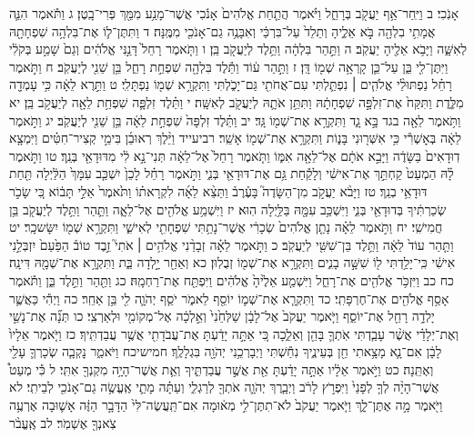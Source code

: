 \documentclass[twoside, openany, parskip=half, 11pt]{book}
\begin{document}
אָנֹֽכִי׃ ב וַיִּֽחַר־אַ֥ף יַעֲקֹ֖ב בְּרָחֵ֑ל וַיֹּ֗אמֶר הֲתַ֤חַת אֱלֹהִים֙ אָנֹ֔כִי אֲשֶׁר־מָנַ֥ע מִמֵּ֖ךְ פְּרִי־בָֽטֶן׃ ג וַתֹּ֕אמֶר הִנֵּ֛ה אֲמָתִ֥י בִלְהָ֖ה בֹּ֣א אֵלֶ֑יהָ וְתֵלֵד֙ עַל־בִּרְכַּ֔י וְאִבָּנֶ֥ה גַם־אָנֹכִ֖י מִמֶּֽנָּה׃ ד וַתִּתֶּן־ל֛וֹ אֶת־בִּלְהָ֥ה שִׁפְחָתָ֖הּ לְאִשָּׁ֑ה וַיָּבֹ֥א אֵלֶ֖יהָ יַעֲקֹֽב׃ ה וַתַּ֣הַר בִּלְהָ֔ה וַתֵּ֥לֶד לְיַעֲקֹ֖ב בֵּֽן׃ ו וַתֹּ֤אמֶר רָחֵל֙ דָּנַ֣נִּי אֱלֹהִ֔ים וְגַם֙ שָׁמַ֣ע בְּקֹלִ֔י וַיִּתֶּן־לִ֖י בֵּ֑ן עַל־כֵּ֛ן קָרְאָ֥ה שְׁמ֖וֹ דָּֽן׃ ז וַתַּ֣הַר ע֔וֹד וַתֵּ֕לֶד בִּלְהָ֖ה שִׁפְחַ֣ת רָחֵ֑ל בֵּ֥ן שֵׁנִ֖י לְיַעֲקֹֽב׃ ח וַתֹּ֣אמֶר רָחֵ֗ל נַפְתּוּלֵ֨י אֱלֹהִ֧ים ׀ נִפְתַּ֛לְתִּי עִם־אֲחֹתִ֖י גַּם־יָכֹ֑לְתִּי וַתִּקְרָ֥א שְׁמ֖וֹ נַפְתָּלִֽי׃ ט וַתֵּ֣רֶא לֵאָ֔ה כִּ֥י עָמְדָ֖ה מִלֶּ֑דֶת וַתִּקַּח֙ אֶת־זִלְפָּ֣ה שִׁפְחָתָ֔הּ וַתִּתֵּ֥ן אֹתָ֛הּ לְיַעֲקֹ֖ב לְאִשָּֽׁה׃ י וַתֵּ֗לֶד זִלְפָּ֛ה שִׁפְחַ֥ת לֵאָ֖ה לְיַעֲקֹ֥ב בֵּֽן׃ יא וַתֹּ֥אמֶר לֵאָ֖ה בגד בָּ֣א גָ֑ד וַתִּקְרָ֥א אֶת־שְׁמ֖וֹ גָּֽד׃ יב וַתֵּ֗לֶד זִלְפָּה֙ שִׁפְחַ֣ת לֵאָ֔ה בֵּ֥ן שֵׁנִ֖י לְיַעֲקֹֽב׃ יג וַתֹּ֣אמֶר לֵאָ֔ה בְּאׇשְׁרִ֕י כִּ֥י אִשְּׁר֖וּנִי בָּנ֑וֹת וַתִּקְרָ֥א אֶת־שְׁמ֖וֹ אָשֵֽׁר׃ רביעייד וַיֵּ֨לֶךְ רְאוּבֵ֜ן בִּימֵ֣י קְצִיר־חִטִּ֗ים וַיִּמְצָ֤א דֽוּדָאִים֙ בַּשָּׂדֶ֔ה וַיָּבֵ֣א אֹתָ֔ם אֶל־לֵאָ֖ה אִמּ֑וֹ וַתֹּ֤אמֶר רָחֵל֙ אֶל־לֵאָ֔ה תְּנִי־נָ֣א לִ֔י מִדּוּדָאֵ֖י בְּנֵֽךְ׃ טו וַתֹּ֣אמֶר לָ֗הּ הַמְעַט֙ קַחְתֵּ֣ךְ אֶת־אִישִׁ֔י וְלָקַ֕חַת גַּ֥ם אֶת־דּוּדָאֵ֖י בְּנִ֑י וַתֹּ֣אמֶר רָחֵ֗ל לָכֵן֙ יִשְׁכַּ֤ב עִמָּךְ֙ הַלַּ֔יְלָה תַּ֖חַת דּוּדָאֵ֥י בְנֵֽךְ׃ טז וַיָּבֹ֨א יַעֲקֹ֣ב מִן־הַשָּׂדֶה֮ בָּעֶ֒רֶב֒ וַתֵּצֵ֨א לֵאָ֜ה לִקְרָאת֗וֹ וַתֹּ֙אמֶר֙ אֵלַ֣י תָּב֔וֹא כִּ֚י שָׂכֹ֣ר שְׂכַרְתִּ֔יךָ בְּדוּדָאֵ֖י בְּנִ֑י וַיִּשְׁכַּ֥ב עִמָּ֖הּ בַּלַּ֥יְלָה הֽוּא׃ יז וַיִּשְׁמַ֥ע אֱלֹהִ֖ים אֶל־לֵאָ֑ה וַתַּ֛הַר וַתֵּ֥לֶד לְיַעֲקֹ֖ב בֵּ֥ן חֲמִישִֽׁי׃ יח וַתֹּ֣אמֶר לֵאָ֗ה נָתַ֤ן אֱלֹהִים֙ שְׂכָרִ֔י אֲשֶׁר־נָתַ֥תִּי שִׁפְחָתִ֖י לְאִישִׁ֑י וַתִּקְרָ֥א שְׁמ֖וֹ יִשָּׂשכָֽר׃ יט וַתַּ֤הַר עוֹד֙ לֵאָ֔ה וַתֵּ֥לֶד בֵּן־שִׁשִּׁ֖י לְיַעֲקֹֽב׃ כ וַתֹּ֣אמֶר לֵאָ֗ה זְבָדַ֨נִי אֱלֹהִ֥ים ׀ אֹתִי֮ זֵ֣בֶד טוֹב֒ הַפַּ֙עַם֙ יִזְבְּלֵ֣נִי אִישִׁ֔י כִּֽי־יָלַ֥דְתִּי ל֖וֹ שִׁשָּׁ֣ה בָנִ֑ים וַתִּקְרָ֥א אֶת־שְׁמ֖וֹ זְבֻלֽוּן׃ כא וְאַחַ֖ר יָ֣לְדָה בַּ֑ת וַתִּקְרָ֥א אֶת־שְׁמָ֖הּ דִּינָֽה׃ כח כב וַיִּזְכֹּ֥ר אֱלֹהִ֖ים אֶת־רָחֵ֑ל וַיִּשְׁמַ֤ע אֵלֶ֙יהָ֙ אֱלֹהִ֔ים וַיִּפְתַּ֖ח אֶת־רַחְמָֽהּ׃ כג וַתַּ֖הַר וַתֵּ֣לֶד בֵּ֑ן וַתֹּ֕אמֶר אָסַ֥ף אֱלֹהִ֖ים אֶת־חֶרְפָּתִֽי׃ כד וַתִּקְרָ֧א אֶת־שְׁמ֛וֹ יוֹסֵ֖ף לֵאמֹ֑ר יֹסֵ֧ף יְהֹוָ֛ה לִ֖י בֵּ֥ן אַחֵֽר׃ כה וַיְהִ֕י כַּאֲשֶׁ֛ר יָלְדָ֥ה רָחֵ֖ל אֶת־יוֹסֵ֑ף וַיֹּ֤אמֶר יַעֲקֹב֙ אֶל־לָבָ֔ן שַׁלְּחֵ֙נִי֙ וְאֵ֣לְכָ֔ה אֶל־מְקוֹמִ֖י וּלְאַרְצִֽי׃ כו תְּנָ֞ה אֶת־נָשַׁ֣י וְאֶת־יְלָדַ֗י אֲשֶׁ֨ר עָבַ֧דְתִּי אֹֽתְךָ֛ בָּהֵ֖ן וְאֵלֵ֑כָה כִּ֚י אַתָּ֣ה יָדַ֔עְתָּ אֶת־עֲבֹדָתִ֖י אֲשֶׁ֥ר עֲבַדְתִּֽיךָ׃ כז וַיֹּ֤אמֶר אֵלָיו֙ לָבָ֔ן אִם־נָ֛א מָצָ֥אתִי חֵ֖ן בְּעֵינֶ֑יךָ נִחַ֕שְׁתִּי וַיְבָרְכֵ֥נִי יְהֹוָ֖ה בִּגְלָלֶֽךָ׃ חמישיכח וַיֹּאמַ֑ר נׇקְבָ֧ה שְׂכָרְךָ֛ עָלַ֖י וְאֶתֵּֽנָה׃ כט וַיֹּ֣אמֶר אֵלָ֔יו אַתָּ֣ה יָדַ֔עְתָּ אֵ֖ת אֲשֶׁ֣ר עֲבַדְתִּ֑יךָ וְאֵ֛ת אֲשֶׁר־הָיָ֥ה מִקְנְךָ֖ אִתִּֽי׃ ל כִּ֡י מְעַט֩ אֲשֶׁר־הָיָ֨ה לְךָ֤ לְפָנַי֙ וַיִּפְרֹ֣ץ לָרֹ֔ב וַיְבָ֧רֶךְ יְהֹוָ֛ה אֹתְךָ֖ לְרַגְלִ֑י וְעַתָּ֗ה מָתַ֛י אֶֽעֱשֶׂ֥ה גַם־אָנֹכִ֖י לְבֵיתִֽי׃ לא וַיֹּ֖אמֶר מָ֣ה אֶתֶּן־לָ֑ךְ וַיֹּ֤אמֶר יַעֲקֹב֙ לֹא־תִתֶּן־לִ֣י מְא֔וּמָה אִם־תַּֽעֲשֶׂה־לִּי֙ הַדָּבָ֣ר הַזֶּ֔ה אָשׁ֛וּבָה אֶרְעֶ֥ה צֹֽאנְךָ֖ אֶשְׁמֹֽר׃ לב אֶֽעֱבֹ֨ר 
\end{document}
